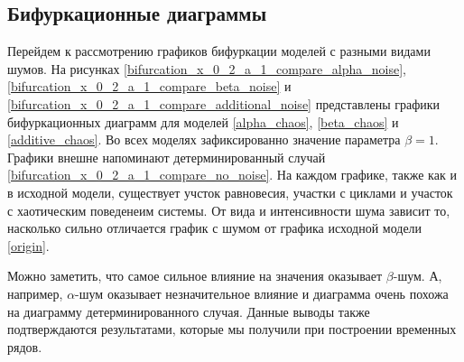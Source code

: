 \subsection{Бифуркационные диаграммы}

    Перейдем к рассмотрению графиков бифуркации моделей с разными видами шумов. На рисунках \ref{bifurcation_x_0_2_a_1_compare_alpha_noise}, \ref{bifurcation_x_0_2_a_1_compare_beta_noise} и \ref{bifurcation_x_0_2_a_1_compare_additional_noise} представлены графики бифуркационных диаграмм для моделей \ref{alpha_chaos}, \ref{beta_chaos} и \ref{additive_chaos}. Во всех моделях зафиксированно значение параметра \(\beta = 1\). Графики внешне напоминают детерминированный случай \ref{bifurcation_x_0_2_a_1_compare_no_noise}. На каждом графике, также как и в исходной модели, существует учсток равновесия, участки с циклами и участок с хаотическим поведенеим системы. От вида и интенсивности шума зависит то, насколько сильно отличается график с шумом от графика исходной модели \ref{origin}. 

    Можно заметить, что самое сильное влияние на значения оказывает \(\beta\)-шум. А, например, \(\alpha\)-шум оказывает незначительное влияние и диаграмма очень похожа на диаграмму детерминированного случая. Данные выводы также подтверждаются результатами, которые мы получили при построении временных рядов.

